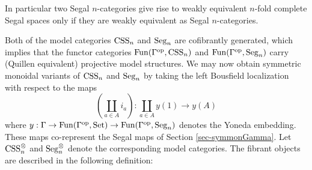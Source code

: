 \documentclass{amsart}
\begin{document}
%
%


In particular two Segal $n$-categories give rise to weakly equivalent $n$-fold complete Segal spaces only if they are weakly equivalent as Segal $n$-categories. 

Both of the model categories $\mathrm{CSS}_n$ and $\mathrm{Seg}_n$ are cofibrantly generated, which 
implies that the functor categories $\operatorname{Fun}(\Gamma^{\mathrm{op}}, \mathrm{CSS}_n)$ and $\operatorname{Fun}(\Gamma^{\mathrm{op}}, \mathrm{Seg}_n)$ carry (Quillen equivalent) projective model structures. We may now obtain symmetric monoidal variants of $\mathrm{CSS}_n$ and $\mathrm{Seg}_n$ by taking the left Bousfield localization with respect to the maps 
\begin{equation*}
	\left(\coprod_{a \in A} i_a\right) :   \coprod_{a \in A} y(1) \to y(A)
\end{equation*}
where $y: \Gamma \to \operatorname{Fun}(\Gamma^{\mathrm{op}}, \mathrm{Set}) \to \operatorname{Fun}(\Gamma^{\mathrm{op}}, \mathrm{Seg}_n)$ denotes the Yoneda embedding. These maps co-represent the Segal maps of Section \ref{sec-symmonGamma}. Let $\mathrm{CSS}_n^{\otimes}$ and $\mathrm{Seg}_n^{\otimes}$ denote the corresponding model categories. 
The fibrant objects are described in the following definition:
\end{document}

